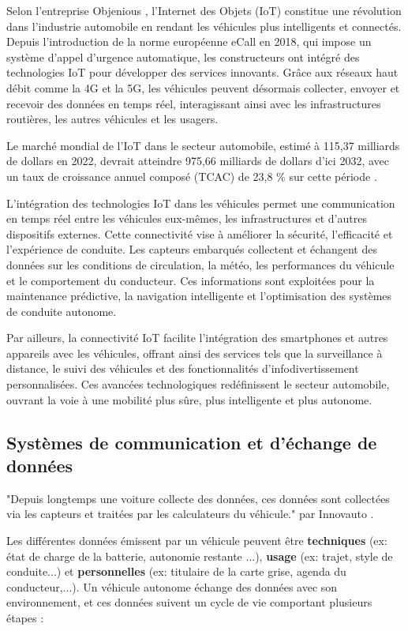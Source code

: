 \documentclass{article}
\begin{document}
Selon l’entreprise Objenious \cite{noauthor_revolution_2025}, l’Internet des Objets (IoT) constitue une révolution dans l’industrie automobile en rendant les véhicules plus intelligents et connectés. Depuis l’introduction de la norme européenne eCall en 2018, qui impose un système d’appel d’urgence automatique, les constructeurs ont intégré des technologies IoT pour développer des services innovants. Grâce aux réseaux haut débit comme la 4G et la 5G, les véhicules peuvent désormais collecter, envoyer et recevoir des données en temps réel, interagissant ainsi avec les infrastructures routières, les autres véhicules et les usagers.

Le marché mondial de l’IoT dans le secteur automobile, estimé à 115,37 milliards de dollars en 2022, devrait atteindre 975,66 milliards de dollars d’ici 2032, avec un taux de croissance annuel composé (TCAC) de 23,8 \% sur cette période \cite{noauthor_taille_2023}.

L’intégration des technologies IoT dans les véhicules permet une communication en temps réel entre les véhicules eux-mêmes, les infrastructures et d’autres dispositifs externes. Cette connectivité vise à améliorer la sécurité, l’efficacité et l’expérience de conduite. Les capteurs embarqués collectent et échangent des données sur les conditions de circulation, la météo, les performances du véhicule et le comportement du conducteur. Ces informations sont exploitées pour la maintenance prédictive, la navigation intelligente et l’optimisation des systèmes de conduite autonome.

Par ailleurs, la connectivité IoT facilite l’intégration des smartphones et autres appareils avec les véhicules, offrant ainsi des services tels que la surveillance à distance, le suivi des véhicules et des fonctionnalités d’infodivertissement personnalisées. Ces avancées technologiques redéfinissent le secteur automobile, ouvrant la voie à une mobilité plus sûre, plus intelligente et plus autonome.


\subsection{Systèmes de communication et d’échange de données}
"Depuis longtemps une voiture collecte des données, ces données sont collectées via les capteurs et traitées par les calculateurs du véhicule." par Innovauto \cite{donnees_echange}.

Les différentes données émissent par un véhicule peuvent être \textbf{techniques} (ex: état de charge de la batterie, autonomie restante ...), \textbf{usage} (ex: trajet, style de conduite...) et \textbf{personnelles} (ex: titulaire de la carte grise, agenda du conducteur,...).
Un véhicule autonome échange des données avec son environnement, et ces données suivent un cycle de vie comportant plusieurs étapes :
\end{document}
